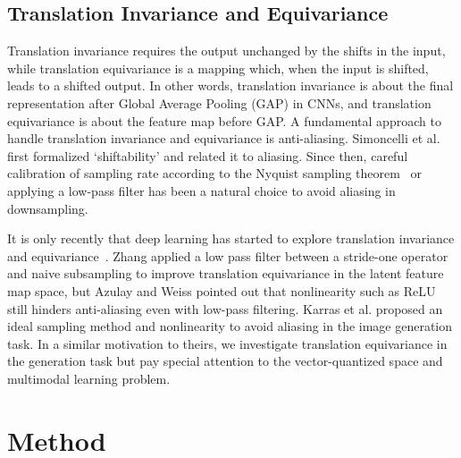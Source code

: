 \documentclass{article}
\newcommand{\wcedit}[1]{\textcolor{blue}{\emph{[Shin: #1]}}}
\begin{document}
\subsection{Translation Invariance and Equivariance}
\vspace{-1mm}

Translation invariance requires the output unchanged by the shifts in the input, while translation equivariance is a mapping which, when the input is shifted, leads to a shifted output. 
In other words, translation invariance is about the final representation after Global Average Pooling (GAP) in CNNs, and translation equivariance is about the feature map before GAP.
A fundamental approach to handle translation invariance and equivariance is anti-aliasing. Simoncelli et al. \cite{simoncelli1992shiftable} first formalized `shiftability' and related it to aliasing. Since then, careful calibration of sampling rate according to the Nyquist sampling theorem~\cite{nyquist1928certain} or applying a low-pass filter has been a natural choice to avoid aliasing in downsampling. 

It is only recently that deep learning has started to explore translation invariance and equivariance~\cite{azulay2018deep,zhang2019making,zou2020delving,vasconcelos2021impact}. 
Zhang \cite{zhang2019making} applied a low pass filter between a stride-one operator and naive subsampling to improve translation equivariance in the latent feature map space, but Azulay and Weiss \cite{azulay2018deep} pointed out that nonlinearity such as ReLU still hinders anti-aliasing even with low-pass filtering. Karras et al. \cite{karras2021alias} proposed an ideal sampling method and nonlinearity to avoid aliasing in the image generation task. In a similar motivation to theirs, we investigate translation equivariance in the generation task but pay special attention to the vector-quantized space and multimodal learning problem.




\section{Method}
\label{sec:method}


\end{document}
